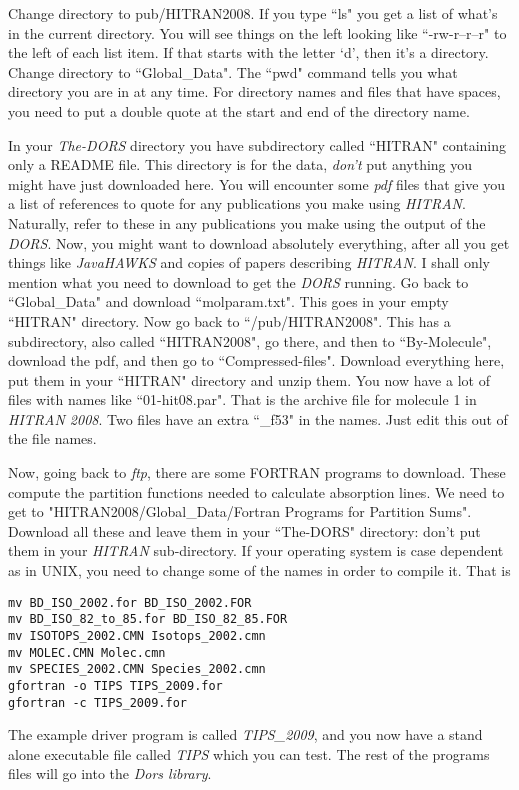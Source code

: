 \documentclass[12pt]{article}
\begin{document}
Change directory to pub/HITRAN2008. If you type ``ls" you get a list of what's in the
current directory.  You will see things on the left looking like ``-rw-r--r--r" to the left of each list
item. If that starts with the letter `d', then it's a directory. Change directory to
``Global\_Data".
The ``pwd" command tells you what directory you are in at any time.
 For directory names and files that have spaces, you need to put a double quote at the start and end of
the directory name. 

In your {\it The-DORS} directory you have subdirectory called ``HITRAN" containing only a README file.
 This directory is for the data, {\it don't} put 
 anything you might have  just downloaded here. You will encounter  some {\it pdf} files that
 give you a list of references to quote
for any publications you make using {\it HITRAN}. Naturally, refer to these in any  publications you make
using the output of the {\it DORS}. Now, you might want to download absolutely everything, after all you get
things like {\it JavaHAWKS} and copies of papers describing {\it HITRAN}. I shall only mention what you need
to download to get the {\it DORS} running. Go back to ``Global\_Data" and download ``molparam.txt".
This goes in your empty ``HITRAN" directory.  Now go back to ``/pub/HITRAN2008". This has a subdirectory,
also called ``HITRAN2008", go there, and then to ``By-Molecule", download the pdf, and then
go to ``Compressed-files". Download everything here, put them in your ``HITRAN" directory and
unzip them. You now have a lot of files with names like ``01-hit08.par". That is the archive file
for molecule 1 in {\it HITRAN 2008}. Two files have an extra ``\_f53"
in the names. Just edit this out of the file names.

Now, going back to {\it ftp}, there are some FORTRAN programs to download. These compute the
partition functions needed to calculate absorption lines.
We need to get to "HITRAN2008/Global\_Data/Fortran Programs for Partition Sums".
Download all these and leave them in your ``The-DORS" directory: don't put them in your {\it HITRAN}
sub-directory.
 If your operating 
system is case dependent as in UNIX, you need to change some of the names in order to compile it. That is
\begin{verbatim}
mv BD_ISO_2002.for BD_ISO_2002.FOR
mv BD_ISO_82_to_85.for BD_ISO_82_85.FOR
mv ISOTOPS_2002.CMN Isotops_2002.cmn
mv MOLEC.CMN Molec.cmn
mv SPECIES_2002.CMN Species_2002.cmn
gfortran -o TIPS TIPS_2009.for
gfortran -c TIPS_2009.for
\end{verbatim}
The example driver program is called {\it TIPS\_2009}, and you now have a stand alone executable file called {\it TIPS} which you can test. The rest of the 
programs files will go into the {\it Dors library}.
\end{document}
